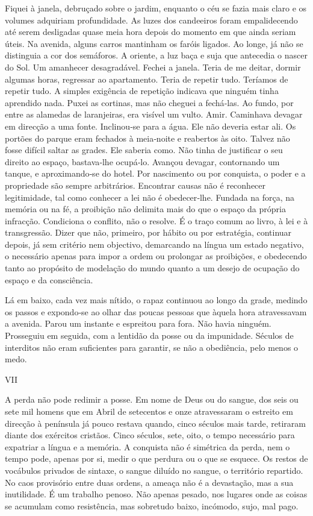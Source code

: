 Fiquei à janela, debruçado sobre o jardim, enquanto o céu se fazia mais
claro e os volumes adquiriam profundidade. As luzes dos candeeiros foram
empalidecendo até serem desligadas quase meia hora depois do momento em
que ainda seriam úteis. Na avenida, alguns carros mantinham os faróis
ligados. Ao longe, já não se distinguia a cor dos semáforos. A oriente,
a luz baça e suja que antecedia o nascer do Sol. Um amanhecer
desagradável. Fechei a janela. Teria de me deitar, dormir algumas horas,
regressar ao apartamento. Teria de repetir tudo. Teríamos de repetir
tudo. A simples exigência de repetição indicava que ninguém tinha
aprendido nada. Puxei as cortinas, mas não cheguei a fechá­‑las. Ao
fundo, por entre as alamedas de laranjeiras, era visível um vulto. Amir.
Caminhava devagar em direcção a uma fonte. Inclinou­‑se para a água. Ele
não deveria estar ali. Os portões do parque eram fechados à meia­‑noite
e reabertos às oito. Talvez não fosse difícil saltar as grades. Ele
saberia como. Não tinha de justificar o seu direito ao espaço,
bastava­‑lhe ocupá­‑lo. Avançou devagar, contornando um tanque, e
aproximando­‑se do hotel. Por nascimento ou por conquista, o poder e a
propriedade são sempre arbitrários. Encontrar causas não é reconhecer
legitimidade, tal como conhecer a lei não é obedecer­‑lhe. Fundada na
força, na memória ou na fé, a proibição não delimita mais do que o
espaço da própria infracção. Condiciona o conflito, não o resolve. É o
traço comum ao livro, à lei e à transgressão. Dizer que não, primeiro,
por hábito ou por estratégia, continuar depois, já sem critério nem
objectivo, demarcando na língua um estado negativo, o necessário apenas
para impor a ordem ou prolongar as proibições, e obedecendo tanto ao
propósito de modelação do mundo quanto a um desejo de ocupação do espaço
e da consciência.

Lá em baixo, cada vez mais nítido, o rapaz continuou ao longo da grade,
medindo os passos e expondo­‑se ao olhar das poucas pessoas que àquela
hora atravessavam a avenida. Parou um instante e espreitou para fora.
Não havia ninguém. Prosseguiu em seguida, com a lentidão da posse ou da
impunidade. Séculos de interditos não eram suficientes para garantir, se
não a obediência, pelo menos o medo.

VII

A perda não pode redimir a posse. Em nome de Deus ou do sangue, dos seis
ou sete mil homens que em Abril de setecentos e onze atravessaram o
estreito em direcção à península já pouco restava quando, cinco séculos
mais tarde, retiraram diante dos exércitos cristãos. Cinco séculos,
sete, oito, o tempo necessário para expatriar a língua e a memória. A
conquista não é simétrica da perda, nem o tempo pode, apenas por si,
medir o que perdura ou o que se esquece. Os restos de vocábulos privados
de sintaxe, o sangue diluído no sangue, o território repartido. No caos
provisório entre duas ordens, a ameaça não é a devastação, mas a sua
inutilidade. É um trabalho penoso. Não apenas pesado, nos lugares onde
as coisas se acumulam como resistência, mas sobretudo baixo, incómodo,
sujo, mal pago.

